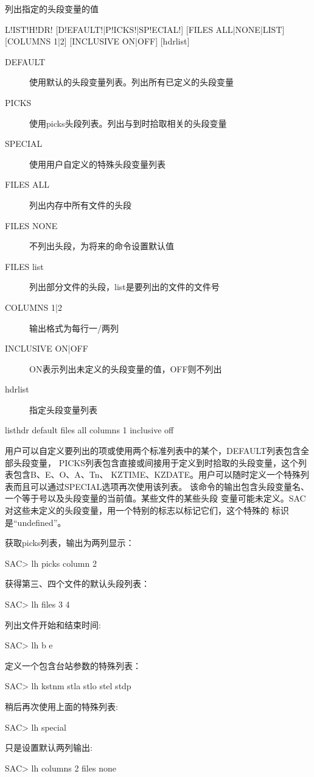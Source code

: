 \label{cmd:listhdr}

列出指定的头段变量的值

\begin{SACSTX}
L!IST!H!DR! [D!EFAULT!|P!ICKS!|SP!ECIAL!] [FILES ALL|NONE|LIST]
    [COLUMNS 1|2] [INCLUSIVE ON|OFF] [hdrlist]
\end{SACSTX}

\begin{description}
\item [DEFAULT] 使用默认的头段变量列表。列出所有已定义的头段变量
\item [PICKS] 使用picks头段列表。列出与到时拾取相关的头段变量
\item [SPECIAL] 使用用户自定义的特殊头段变量列表
\item [FILES ALL] 列出内存中所有文件的头段
\item [FILES NONE] 不列出头段，为将来的命令设置默认值
\item [FILES list] 列出部分文件的头段，list是要列出的文件的文件号
\item [COLUMNS 1|2] 输出格式为每行一/两列
\item [INCLUSIVE ON|OFF] ON表示列出未定义的头段变量的值，OFF则不列出
\item [hdrlist] 指定头段变量列表
\end{description}

\begin{SACDFT}
listhdr default files all columns 1 inclusive off
\end{SACDFT}

用户可以自定义要列出的项或使用两个标准列表中的某个，DEFAULT列表包含全部头段变量，
PICKS列表包含直接或间接用于定义到时拾取的头段变量，这个列表包含B、E、O、A、Tn、
KZTIME、KZDATE。用户可以随时定义一个特殊列表而且可以通过SPECIAL选项再次使用该列表。
该命令的输出包含头段变量名、一个等于号以及头段变量的当前值。某些文件的某些头段
变量可能未定义。SAC对这些未定义的头段变量，用一个特别的标志以标记它们，这个特殊的
标识是``undefined''。

获取picks列表，输出为两列显示：
\begin{SACCode}
SAC> lh picks column 2
\end{SACCode}

获得第三、四个文件的默认头段列表：
\begin{SACCode}
SAC> lh files 3 4
\end{SACCode}

列出文件开始和结束时间:
\begin{SACCode}
SAC> lh b e
\end{SACCode}

定义一个包含台站参数的特殊列表：
\begin{SACCode}
SAC> lh kstnm stla stlo stel stdp
\end{SACCode}

稍后再次使用上面的特殊列表:
\begin{SACCode}
SAC> lh special
\end{SACCode}

只是设置默认两列输出:
\begin{SACCode}
SAC> lh columns 2 files none
\end{SACCode}
